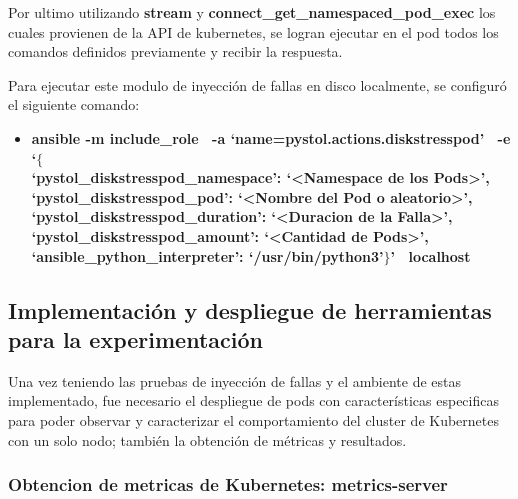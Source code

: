 \par Por ultimo utilizando \textbf{stream} y \textbf{connect\_get\_namespaced\_pod\_exec} los cuales provienen de la API de kubernetes, se logran ejecutar en el pod todos los comandos definidos previamente y recibir la respuesta.\\

\par Para ejecutar este modulo de inyección de fallas en disco localmente, se configur\'o el siguiente comando:
\begin{itemize}
    \item \textbf{ansible -m include\_role \ -a `name=pystol.actions.diskstresspod' \ -e `$\{$ \\
    `pystol\_diskstresspod\_namespace': `<Namespace de los Pods>', \\
    `pystol\_diskstresspod\_pod': `<Nombre del Pod o aleatorio>', \\
    `pystol\_diskstresspod\_duration': `<Duracion de la Falla>', \\
    `pystol\_diskstresspod\_amount': `<Cantidad de Pods>', \\
    `ansible\_python\_interpreter': `/usr/bin/python3'$\}$' \ localhost} %
\end{itemize}


\subsection{Implementación y despliegue de herramientas para la experimentación}
\par Una vez teniendo las pruebas de inyección de fallas y el ambiente de estas implementado, fue necesario el despliegue de pods con características especificas para poder observar y caracterizar el comportamiento del cluster de Kubernetes con un solo nodo; también la obtención de métricas y resultados.\\
\subsubsection{Obtencion de metricas de Kubernetes: metrics-server}

